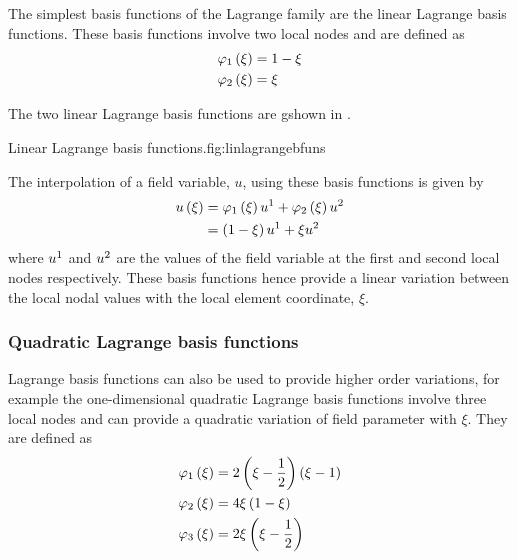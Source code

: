 The simplest basis functions of the Lagrange family are the \onedal linear
Lagrange basis functions. These basis functions involve two local nodes and
are defined as
\begin{equation}
  \begin{split}
    \lbfn{1}{\xi}&=1-\xi \\
    \lbfn{2}{\xi}&=\xi
  \end{split}
  \label{eqn:linearlbfuns}
\end{equation}

The two \onedal linear Lagrange basis functions are gshown in .

{Linear Lagrange basis functions.}{fig:linlagrangebfuns}

The interpolation of a field variable, $u$, using these basis functions is
given by
\begin{equation}
  \begin{split}
     u\left( \xi \right) &=   \varphi_{1} \left( \xi \right)   {u}^{1} +   \varphi_{2} \left( \xi \right)   {u}^{2}  \\
    &=\left( 1-\xi \right) {u}^{1} +\xi {u}^{2} 
  \end{split}
\end{equation}
where $ {u}^{1} $ and $ {u}^{2} $ are the values of the field variable at
the first and second local nodes respectively. These basis functions hence
provide a linear variation between the local nodal values with the local
element coordinate, $\xi$.

\subsubsection{Quadratic Lagrange basis functions}

Lagrange basis functions can also be used to provide higher order variations,
for example the one-dimensional quadratic Lagrange basis functions involve
three local nodes and can provide a quadratic variation of field parameter
with $\xi$. They are defined as
\begin{equation}
  \begin{split}
    \lbfn{1}{\xi}&=2\pbrac{\xi-\frac12}\pbrac{\xi-1} \\
    \lbfn{2}{\xi}&=4\xi\pbrac{1-\xi} \\
    \lbfn{3}{\xi}&=2\xi\pbrac{\xi-\frac12}
  \end{split}
  \label{eqn:quadraticlbfuns}
\end{equation}

